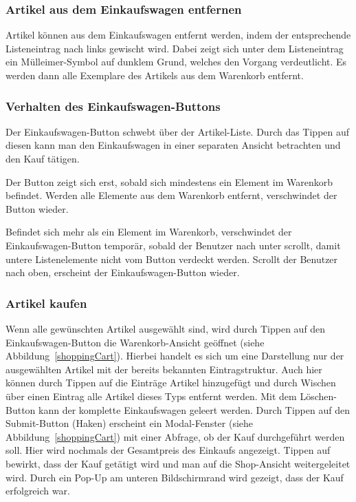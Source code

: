 \subsubsection{Artikel aus dem Einkaufswagen entfernen} \label{subsubsec:shoppingcart-del-item}

Artikel können aus dem Einkaufswagen entfernt werden, indem der entsprechende Listeneintrag nach links gewischt wird.
Dabei zeigt sich unter dem Listeneintrag ein Mülleimer-Symbol auf dunklem Grund, welches den Vorgang verdeutlicht.
Es werden dann alle Exemplare des Artikels aus dem Warenkorb entfernt.

\subsubsection{Verhalten des Einkaufswagen-Buttons} \label{subsubsec:shoppingcart-button}

Der Einkaufswagen-Button schwebt über der Artikel-Liste.
Durch das Tippen auf diesen kann man den Einkaufswagen in einer separaten Ansicht betrachten und den Kauf tätigen.

Der Button zeigt sich erst, sobald sich mindestens ein Element im Warenkorb befindet.
Werden alle Elemente aus dem Warenkorb entfernt, verschwindet der Button wieder.

Befindet sich mehr als ein Element im Warenkorb, verschwindet der Einkaufswagen-Button temporär, sobald der Benutzer nach unter scrollt, damit untere Listenelemente nicht vom Button verdeckt werden.
Scrollt der Benutzer nach oben, erscheint der Einkaufswagen-Button wieder.

\subsubsection{Artikel kaufen} \label{subsubsec:shop-buy}

Wenn alle gewünschten Artikel ausgewählt sind, wird durch Tippen auf den Einkaufswagen-Button die Warenkorb-Ansicht geöffnet (siehe Abbildung~\ref{shoppingCart}).
Hierbei handelt es sich um eine Darstellung nur der ausgewählten Artikel mit der bereits bekannten Eintragstruktur.
Auch hier können durch Tippen auf die Einträge Artikel hinzugefügt und durch Wischen über einen Eintrag alle Artikel dieses Typs entfernt werden.
Mit dem Löschen-Button kann der komplette Einkaufswagen geleert werden.
Durch Tippen auf den Submit-Button (Haken) erscheint ein Modal-Fenster (siehe Abbildung~\ref{shoppingCart}) mit einer Abfrage, ob der Kauf durchgeführt werden soll.
Hier wird nochmals der Gesamtpreis des Einkaufs angezeigt.
Tippen auf  bewirkt, dass der Kauf getätigt wird und man auf die Shop-Ansicht weitergeleitet wird.
Durch ein Pop-Up am unteren Bildschirmrand wird gezeigt, dass der Kauf erfolgreich war.

